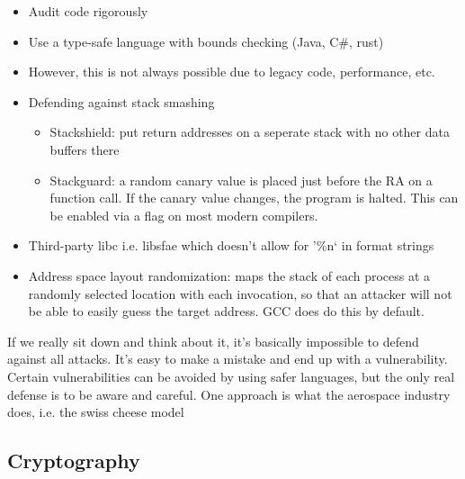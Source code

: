 \documentclass[../notes.tex]{subfiles}
\begin{document}
\begin{itemize}
    \item Audit code rigorously
    \item Use a type-safe language with bounds checking (Java, C\#, rust)
    \item However, this is not always possible due to legacy code, performance, etc.
    \item Defending against stack smashing
        \begin{itemize}
            \item Stackshield: put return addresses on a seperate stack with no other data buffers there
            \item Stackguard: a random canary value is placed just before the RA on a function call. If the canary value changes, the program is halted. This can be enabled via a flag on most modern compilers.
        \end{itemize}
    \item Third-party libc i.e. libsfae which doesn't allow for '\%n` in format strings
    \item Address space layout randomization: maps the stack of each process at a randomly selected location with each invocation, so that an attacker will not be able to easily guess the target address. GCC does do this by default.

\end{itemize}

If we really sit down and think about it, it's basically impossible to defend against all attacks. 
It's easy to make a mistake and end up with a vulnerability. Certain vulnerabilities can be avoided by using safer languages, but the only real defense is to be aware and careful.
One approach is what the aerospace industry does, i.e. the swiss cheese model 


\subsection{Cryptography}
\end{document}
